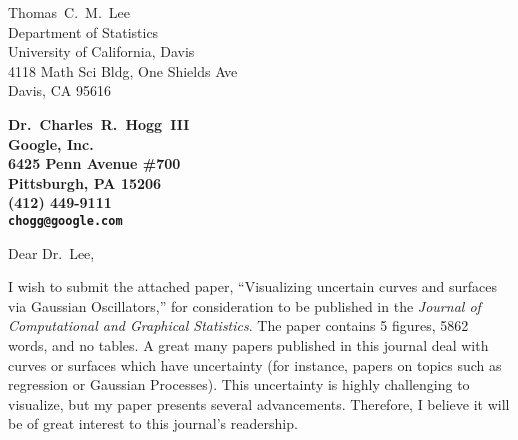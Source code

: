 \documentclass[11pt]{letter} %
\begin{document}

\begin{letter}{%
    Thomas~C.~M.~Lee \\
    Department of Statistics \\
    University of California, Davis  \\
    4118 Math Sci Bldg, One Shields Ave  \\
    Davis, CA 95616
}


\begin{center}
\large\bf Dr.~Charles~R.~Hogg~III \\ %
Google, Inc. \\ 6425 Penn Avenue \#700 \\ Pittsburgh, PA 15206 \\ (412) 449-9111 %
\\ \texttt{chogg@google.com}
\end{center} 
\vfill

\signature{Charles~R.~Hogg~III} %


\opening{Dear Dr.~Lee,} 

I wish to submit the attached paper, ``Visualizing uncertain curves and surfaces via Gaussian Oscillators,'' for consideration to be published in the \textit{Journal of Computational and Graphical Statistics}.
The paper contains 5 figures, 5862 words, and no tables.
A great many papers published in this journal deal with curves or surfaces which have uncertainty (for instance, papers on topics such as regression or Gaussian Processes).
This uncertainty is highly challenging to visualize, but my paper presents several advancements.
Therefore, I believe it will be of great interest to this journal's readership.


\end{letter}
\end{document}
